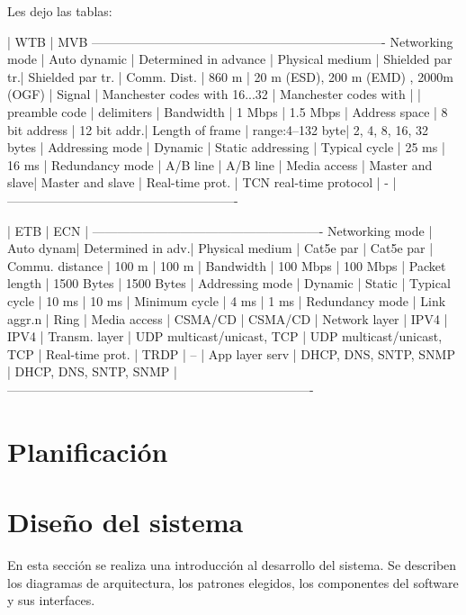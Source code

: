 \documentclass[
11pt, %
]{charter}
\begin{document}
Les dejo las tablas:

| WTB | MVB
----------------------------------------------------------------------
Networking mode | Auto  dynamic | Determined in advance |
Physical medium | Shielded par tr.| Shielded par tr. |
Comm. Dist. | 860 m | 20 m (ESD), 200 m (EMD) , 2000m (OGF) |
Signal | Manchester codes with 16...32 | Manchester codes with |
| preamble code | delimiters |
Bandwidth | 1 Mbps | 1.5 Mbps |
Address space | 8 bit address | 12 bit addr.|
Length of frame | range:4–132 byte| 2, 4, 8, 16, 32 bytes |
Addressing mode | Dynamic | Static addressing |
Typical cycle | 25 ms | 16 ms |
Redundancy mode | A/B line | A/B line |
Media access | Master and slave| Master and slave |
Real-time prot. | TCN real-time protocol | - |
-------------------------------------------------------

| ETB | ECN |
-------------------------------------------------------
Networking mode | Auto  dynam| Determined in adv.|
Physical medium | Cat5e par   | Cat5e par  |
Commu. distance | 100 m | 100 m  |
Bandwidth | 100 Mbps | 100 Mbps  |
Packet length | 1500 Bytes | 1500 Bytes  |
Addressing mode | Dynamic | Static  |
Typical cycle | 10 ms | 10 ms |
Minimum cycle | 4 ms | 1 ms |
Redundancy mode | Link aggr.n | Ring |
Media access | CSMA/CD | CSMA/CD |
Network layer | IPV4 | IPV4 |
Transm. layer | UDP multicast/unicast, TCP | UDP multicast/unicast, TCP |
Real-time prot. | TRDP | – |
App layer serv | DHCP, DNS, SNTP, SNMP | DHCP, DNS, SNTP, SNMP |
-------------------------------------------------------------------------

\pagebreak

\section{Planificación}

\pagebreak

\section{Diseño del sistema}
En esta sección se realiza una introducción al desarrollo del sistema. Se describen los diagramas de arquitectura, los patrones elegidos, los componentes del software y sus interfaces.
\end{document}
